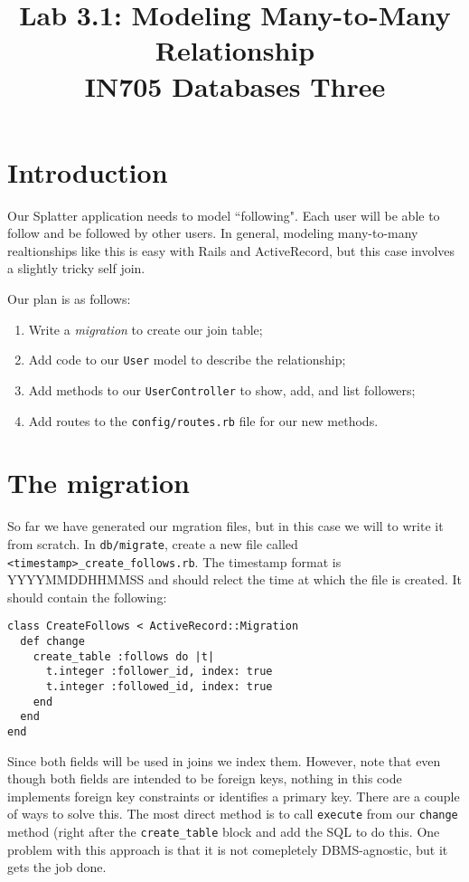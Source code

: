 \documentclass{article}
\begin{document}
\title{Lab 3.1: Modeling Many-to-Many Relationship \\ IN705 Databases Three}
\date{}
\maketitle

\section*{Introduction}
Our Splatter application needs to model ``following".  Each user will be able to follow and be followed by other users.  In general, modeling many-to-many realtionships like this is easy with Rails and ActiveRecord, but this case involves a slightly tricky self join.

Our plan is as follows:
\begin{enumerate}
  \item Write a \emph{migration} to create our join table;
  \item Add code to our \texttt{User} model to describe the relationship;
  \item Add methods to our \texttt{UserController} to show, add, and list followers;
  \item Add routes to the \texttt{config/routes.rb} file for our new methods.
\end{enumerate}

\section{The migration}
So far we have generated our mgration files, but in this case we will to write it from scratch.  In \texttt{db/migrate}, create a new file called \texttt{<timestamp>\_create\_follows.rb}. The timestamp format is YYYYMMDDHHMMSS and should relect the time at which the file is created. It should contain the following:

\begin{verbatim}
class CreateFollows < ActiveRecord::Migration
  def change
    create_table :follows do |t|
      t.integer :follower_id, index: true
      t.integer :followed_id, index: true
    end
  end
end
\end{verbatim}

Since both fields will be used in joins we index them.  However, note that even though both fields are intended to be foreign keys, nothing in this code implements foreign key constraints or identifies a primary key. There are a couple of ways to solve this.  The most direct method is to call \texttt{execute} from our \texttt{change} method (right after the \texttt{create\_table} block and add the SQL to do this.  One problem with this approach is that it is not comepletely DBMS-agnostic, but it gets the job done.
\end{document}
